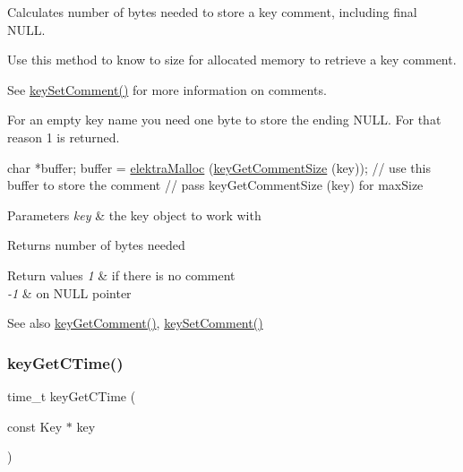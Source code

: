 Calculates number of bytes needed to store a key comment, including final N\+U\+LL. 

Use this method to know to size for allocated memory to retrieve a key comment.

See \hyperlink{group__meta_ga8863a877a84fa46e6017fe72e49b89c1}{key\+Set\+Comment()} for more information on comments.

For an empty key name you need one byte to store the ending N\+U\+LL. For that reason 1 is returned.


\begin{DoxyCode}
 \textcolor{keywordtype}{char} *buffer;
 buffer = \hyperlink{internal_8c_a35cdc2e5caed3454cb73b4fc7f37858c}{elektraMalloc} (\hyperlink{group__meta_ga0dd737fadc16d4cf16720d17f066a9d3}{keyGetCommentSize} (key));
\textcolor{comment}{// use this buffer to store the comment}
\textcolor{comment}{// pass keyGetCommentSize (key) for maxSize}
\end{DoxyCode}



\begin{DoxyParams}{Parameters}
{\em key} & the key object to work with \\
\hline
\end{DoxyParams}
\begin{DoxyReturn}{Returns}
number of bytes needed 
\end{DoxyReturn}

\begin{DoxyRetVals}{Return values}
{\em 1} & if there is no comment \\
\hline
{\em -\/1} & on N\+U\+LL pointer \\
\hline
\end{DoxyRetVals}
\begin{DoxySeeAlso}{See also}
\hyperlink{group__meta_gafb89735689929ff717cc9f2d0d0b46a2}{key\+Get\+Comment()}, \hyperlink{group__meta_ga8863a877a84fa46e6017fe72e49b89c1}{key\+Set\+Comment()} 
\end{DoxySeeAlso}
\mbox{\label{group__meta_ga2c213c120cbe02201278ef7fb8cd94be}} 
\subsubsection{\texorpdfstring{key\+Get\+C\+Time()}{keyGetCTime()}}
{\footnotesize\ttfamily time\+\_\+t key\+Get\+C\+Time (\begin{DoxyParamCaption}\item[{const Key $\ast$}]{key }\end{DoxyParamCaption})}




